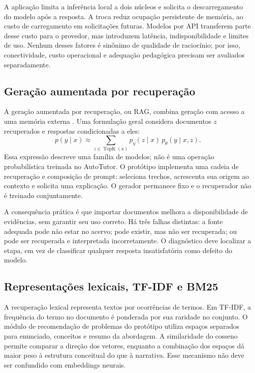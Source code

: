\documentclass[12pt]{article}
\begin{document}
A aplicação limita a inferência local a dois núcleos e solicita o descarregamento do modelo após a resposta. A troca reduz ocupação persistente de memória, ao custo de carregamento em solicitações futuras. Modelos por API transferem parte desse custo para o provedor, mas introduzem latência, indisponibilidade e limites de uso. Nenhum desses fatores é sinônimo de qualidade de raciocínio; por isso, conectividade, custo operacional e adequação pedagógica precisam ser avaliados separadamente.

\subsection{Geração aumentada por recuperação}
A geração aumentada por recuperação, ou RAG, combina geração com acesso a uma memória externa \cite{lewis2020}. Uma formulação geral considera documentos $z$ recuperados e respostas condicionadas a eles:
\begin{equation}
 p(y\mid x)\approx\sum_{z\in\operatorname{TopK}(x)}p_\eta(z\mid x)\,p_\theta(y\mid x,z).
\end{equation}
Essa expressão descreve uma família de modelos; não é uma operação probabilística treinada no AutoTutor. O protótipo implementa uma cadeia de recuperação e composição de prompt: seleciona trechos, acrescenta sua origem ao contexto e solicita uma explicação. O gerador permanece fixo e o recuperador não é treinado conjuntamente.

A consequência prática é que importar documentos melhora a disponibilidade de evidências, sem garantir seu uso correto. Há três falhas distintas: a fonte adequada pode não estar no acervo; pode existir, mas não ser recuperada; ou pode ser recuperada e interpretada incorretamente. O diagnóstico deve localizar a etapa, em vez de classificar qualquer resposta insatisfatória como defeito do modelo.

\subsection{Representações lexicais, TF-IDF e BM25}
A recuperação lexical representa textos por ocorrências de termos. Em TF-IDF, a frequência do termo no documento é ponderada por sua raridade no conjunto. O módulo de recomendação de problemas do protótipo utiliza espaços separados para enunciado, conceitos e resumo da abordagem. A similaridade do cosseno permite comparar a direção dos vetores, enquanto a combinação dos espaços dá maior peso à estrutura conceitual do que à narrativa. Esse mecanismo não deve ser confundido com embeddings neurais.
\end{document}

